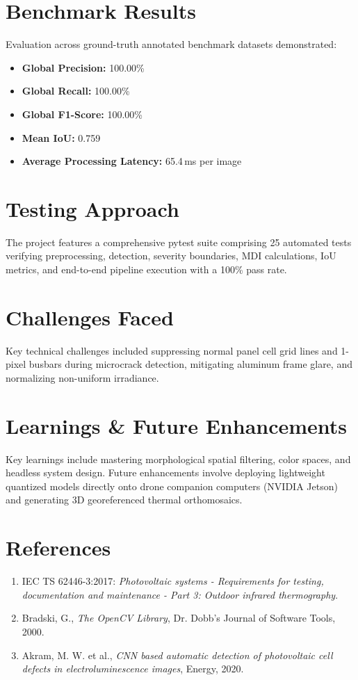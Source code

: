 \documentclass[11pt,a4paper]{article}
\begin{document}
\section{Benchmark Results}
Evaluation across ground-truth annotated benchmark datasets demonstrated:
\begin{itemize}
    \item \textbf{Global Precision:} 100.00\%
    \item \textbf{Global Recall:} 100.00\%
    \item \textbf{Global F1-Score:} 100.00\%
    \item \textbf{Mean IoU:} 0.759
    \item \textbf{Average Processing Latency:} 65.4\,ms per image
\end{itemize}

\section{Testing Approach}
The project features a comprehensive pytest suite comprising 25 automated tests verifying preprocessing, detection, severity boundaries, MDI calculations, IoU metrics, and end-to-end pipeline execution with a 100\% pass rate.

\section{Challenges Faced}
Key technical challenges included suppressing normal panel cell grid lines and 1-pixel busbars during microcrack detection, mitigating aluminum frame glare, and normalizing non-uniform irradiance.

\section{Learnings \& Future Enhancements}
Key learnings include mastering morphological spatial filtering, color spaces, and headless system design. Future enhancements involve deploying lightweight quantized models directly onto drone companion computers (NVIDIA Jetson) and generating 3D georeferenced thermal orthomosaics.

\section{References}
\begin{enumerate}
    \item IEC TS 62446-3:2017: \textit{Photovoltaic systems - Requirements for testing, documentation and maintenance - Part 3: Outdoor infrared thermography}.
    \item Bradski, G., \textit{The OpenCV Library}, Dr. Dobb's Journal of Software Tools, 2000.
    \item Akram, M. W. et al., \textit{CNN based automatic detection of photovoltaic cell defects in electroluminescence images}, Energy, 2020.
\end{enumerate}
\end{document}
